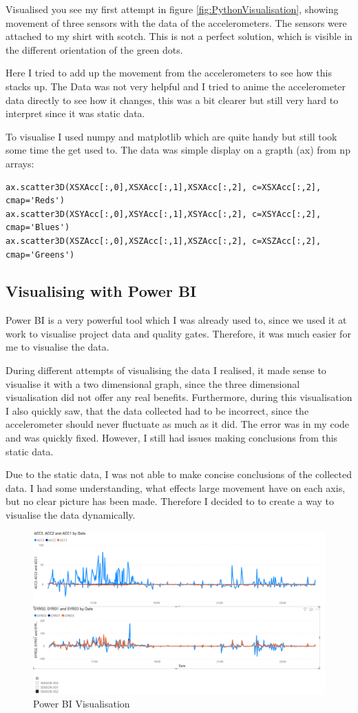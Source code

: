 Visualised you see my first attempt in figure \ref{fig:PythonVisualisation}, showing movement of three sensors with the data of the accelerometers. The sensors were attached to my shirt with scotch. This is not a perfect solution, which is visible in the different orientation of the green dots. 

Here I tried to add up the movement from the accelerometers to see how this stacks up. The Data was not very helpful and I tried to anime the accelerometer data directly to see how it changes, this was a bit clearer but still very hard to interpret since it was static data. 

To visualise I used numpy and matplotlib which are quite handy but still took some time the get used to.
The data was simple display on a grapth (ax) from np arrays:

\begin{lstlisting}
ax.scatter3D(XSXAcc[:,0],XSXAcc[:,1],XSXAcc[:,2], c=XSXAcc[:,2], cmap='Reds')
ax.scatter3D(XSYAcc[:,0],XSYAcc[:,1],XSYAcc[:,2], c=XSYAcc[:,2], cmap='Blues')
ax.scatter3D(XSZAcc[:,0],XSZAcc[:,1],XSZAcc[:,2], c=XSZAcc[:,2], cmap='Greens')
\end{lstlisting}

\subsection{Visualising with Power BI}

\gls{Power BI} is a very powerful tool which I was already used to, since we used it at work to visualise project data and quality gates. Therefore, it was much easier for me to visualise the data.

During different attempts of visualising the data I realised, it made sense to visualise it with a two dimensional graph, since the three dimensional visualisation did not offer any real benefits. Furthermore, during this visualisation I also quickly saw, that the data collected had to be incorrect, since the accelerometer should never fluctuate as much as it did. The error was in my code and was quickly fixed. However, I still had issues making conclusions from this static data.

Due to the static data, I was not able to make concise conclusions of the collected data. I had some understanding, what effects large movement have on each axis, but no clear picture has been made. Therefore I decided to to create a way to visualise the data dynamically.

\begin{figure}[h]
\begin{center}
\includegraphics[width=0.7\linewidth]{images/PowerBIVisualisiation.png}
  \end{center}
  \caption{Power BI Visualisation}
  \label{fig:PowerBIVisualisation}
\end{figure}

\newpage